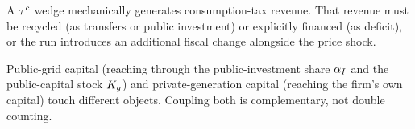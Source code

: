 \begin{principle}
A $\tau^{c}$ wedge mechanically generates consumption-tax revenue. That revenue must be
recycled (as transfers or public investment) or explicitly financed (as deficit), or
the run introduces an additional fiscal change alongside the price shock.
\end{principle}

\begin{principle}
Public-grid capital (reaching \OGCore{} through the public-investment share $\alpha_{I}$
and the public-capital stock $K_{g}$) and private-generation capital (reaching the
firm's own capital) touch different objects. Coupling both is complementary, not double
counting.
\end{principle}
